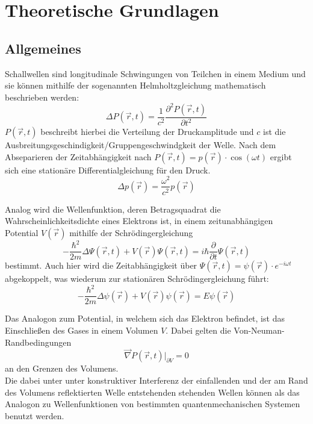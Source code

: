 \section{Theoretische Grundlagen}
    \subsection{Allgemeines}
        Schallwellen sind longitudinale Schwingungen von Teilchen in einem Medium und sie können mithilfe der sogenannten Helmholtzgleichung mathematisch beschrieben werden:
        \begin{equation*}
            \Delta P(\vec{r},t) = \frac{1}{c^2} \frac{\partial^2 P(\vec{r},t)}{\partial t^2}
        \end{equation*}
        $P(\vec{r},t)$ beschreibt hierbei die Verteilung der Druckamplitude und $c$ ist die Ausbreitungsgeschindigkeit/Gruppengeschwindgkeit der Welle.
        Nach dem Abseparieren der Zeitabhängigkeit nach $P(\vec{r},t) = p(\vec{r}) \cdot \cos(\omega t)$ ergibt sich eine stationäre Differentialgleichung für den Druck.
        \begin{equation}
            \Delta p(\vec{r}) = \frac{\omega^2}{c^2} p(\vec{r})
            \label{eqn:helmholtz}
        \end{equation}

        Analog wird die Wellenfunktion, deren Betragsquadrat die Wahrscheinlichkeitsdichte eines Elektrons ist, in einem zeitunabhängigen Potential $V(\vec{r})$ mithilfe der Schrödingergleichung
        \begin{equation*}
            -\frac{\hbar^2}{2m} \Delta \Psi(\vec{r},t) + V(\vec{r}) \Psi(\vec{r},t) = i\hbar \frac{\partial}{\partial t} \Psi(\vec{r},t)
        \end{equation*}
        bestimmt. Auch hier wird die Zeitabhängigkeit über $\Psi(\vec{r},t) = \psi(\vec{r}) \cdot e^{-i \omega t}$ abgekoppelt, was wiederum zur stationären Schrödingergleichung führt:
        \begin{equation}
            -\frac{\hbar^2}{2m} \Delta \psi(\vec{r}) + V(\vec{r}) \psi(\vec{r}) = E \psi(\vec{r})
            \label{eqn:schrödinger}
        \end{equation}

        Das Analogon zum Potential, in welchem sich das Elektron befindet, ist das Einschließen des Gases in einem Volumen $V$.
        Dabei gelten die Von-Neuman-Randbedingungen
        \begin{equation*}
            \vec{\nabla} P(\vec{r},t) |_{\partial V} = 0
        \end{equation*}
        an den Grenzen des Volumens. \\
        Die dabei unter unter konstruktiver Interferenz der einfallenden und der am Rand des Volumens reflektierten Welle entstehenden stehenden Wellen können als das Analogon zu Wellenfunktionen von bestimmten quantenmechanischen Systemen benutzt werden.

